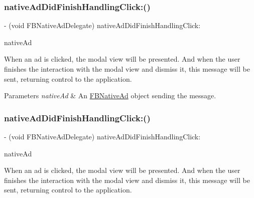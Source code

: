 \subsubsection{\texorpdfstring{native\+Ad\+Did\+Finish\+Handling\+Click\+:()}{nativeAdDidFinishHandlingClick:()}\hspace{0.1cm}{\footnotesize\ttfamily [2/5]}}
{\footnotesize\ttfamily -\/ (void F\+B\+Native\+Ad\+Delegate) native\+Ad\+Did\+Finish\+Handling\+Click\+: \begin{DoxyParamCaption}\item[{(\hyperlink{interfaceFBNativeAd}{F\+B\+Native\+Ad} $\ast$)}]{native\+Ad }\end{DoxyParamCaption}}

When an ad is clicked, the modal view will be presented. And when the user finishes the interaction with the modal view and dismiss it, this message will be sent, returning control to the application.


\begin{DoxyParams}{Parameters}
{\em native\+Ad} & An \hyperlink{interfaceFBNativeAd}{F\+B\+Native\+Ad} object sending the message. \\
\hline
\end{DoxyParams}
\mbox{\label{protocolFBNativeAdDelegate_01-p_a94d3846b43d38539da5f28804f75da70}} 
\subsubsection{\texorpdfstring{native\+Ad\+Did\+Finish\+Handling\+Click\+:()}{nativeAdDidFinishHandlingClick:()}\hspace{0.1cm}{\footnotesize\ttfamily [3/5]}}
{\footnotesize\ttfamily -\/ (void F\+B\+Native\+Ad\+Delegate) native\+Ad\+Did\+Finish\+Handling\+Click\+: \begin{DoxyParamCaption}\item[{(\hyperlink{interfaceFBNativeAd}{F\+B\+Native\+Ad} $\ast$)}]{native\+Ad }\end{DoxyParamCaption}}

When an ad is clicked, the modal view will be presented. And when the user finishes the interaction with the modal view and dismiss it, this message will be sent, returning control to the application.


